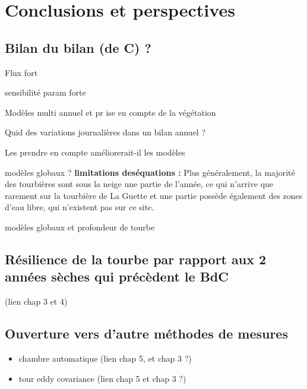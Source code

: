 \chapter*{Conclusions et perspectives}
\newpage

\section{Bilan du bilan (de C) ?}

Flux fort

sensibilité param forte

Modèles multi annuel et pr ise en compte de la végétation

Quid des variations journalières dans un bilan annuel ? 

Les prendre en compte améliorerait-il les modèles

modèles globaux ?
\textbf{limitations deséquations :}
Plus généralement, la majorité des tourbières sont sous la neige une partie de l'année, ce qui n'arrive que rarement sur la tourbière de La Guette et une partie possède également des zones d'eau libre, qui n'existent pas sur ce site.

modèles globaux et profondeur de tourbe

\section{Résilience de la tourbe par rapport aux 2 années sèches qui précèdent le BdC}
(lien chap 3 et 4)

\section{Ouverture vers d'autre méthodes de mesures}
\begin{itemize}
\item chambre automatique (lien chap 5, et chap 3 ?)
\item tour eddy covariance (lien chap 5 et chap 3 ?)
\end{itemize}
